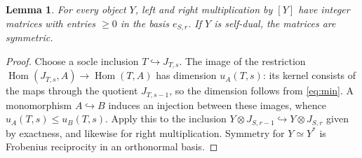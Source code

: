 \documentclass[11pt,reqno]{amsart}
\newtheorem{lemma}[theorem]{Lemma}
\theoremstyle{definition}
\newcommand{\Hom}{\operatorname{Hom}}
\begin{document}
\begin{lemma}\label{lem:layer-positive}
For every object $Y$, left and right multiplication by $[Y]$ have integer matrices
with entries $\geq0$ in the basis $e_{S,r}$. If $Y$ is self-dual, the matrices
are symmetric.
\end{lemma}
\begin{proof}
Choose a socle inclusion $T\hookrightarrow J_{T,s}$. The image of the
restriction $\Hom(J_{T,s},A)\longrightarrow\Hom(T,A)$ has dimension
$u_A(T,s)$: its kernel consists of the maps through the quotient
$J_{T,s-1}$, so the dimension follows from \eqref{eq:min}. A monomorphism
$A\hookrightarrow B$ induces an injection between these images, whence
$u_A(T,s)\leq u_B(T,s)$. Apply this to the inclusion
$Y\otimes J_{S,r-1}\hookrightarrow Y\otimes J_{S,r}$ given by exactness,
and likewise for right multiplication. Symmetry for $Y\simeq Y^*$ is
Frobenius reciprocity in an orthonormal basis.
\end{proof}
\end{document}
